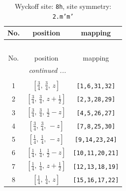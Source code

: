 \documentclass[fleqn,8pt]{jsarticle}
\begin{document}
\begin{longtable}{ccc}
\caption{Wyckoff site: {\tt 8h}, site symmetry: {\tt 2.m'm'}}
 \\
 \hline \hline
No. & position & mapping \\ \hline \endfirsthead

\multicolumn{2}{l}{\tablename\ \thetable{}} \\
 \hline \hline
No. & position & mapping \\ \hline \endhead

 \hline \hline
\multicolumn{2}{r}{\footnotesize\it continued ...} \\ \endfoot

 \hline \hline
\multicolumn{2}{r}{} \\ \endlastfoot

1 & $\left[ \frac{3}{4},\, \frac{3}{4},\, z \right]$ & {\tt [1,6,31,32]} \\ \hline
2 & $\left[ \frac{3}{4},\, \frac{3}{4},\, z + \frac{1}{2} \right]$ & {\tt [2,3,28,29]} \\ \hline
3 & $\left[ \frac{3}{4},\, \frac{3}{4},\, \frac{1}{2} - z \right]$ & {\tt [4,5,26,27]} \\ \hline
4 & $\left[ \frac{3}{4},\, \frac{3}{4},\, - z \right]$ & {\tt [7,8,25,30]} \\ \hline
5 & $\left[ \frac{1}{4},\, \frac{1}{4},\, - z \right]$ & {\tt [9,14,23,24]} \\ \hline
6 & $\left[ \frac{1}{4},\, \frac{1}{4},\, \frac{1}{2} - z \right]$ & {\tt [10,11,20,21]} \\ \hline
7 & $\left[ \frac{1}{4},\, \frac{1}{4},\, z + \frac{1}{2} \right]$ & {\tt [12,13,18,19]} \\ \hline
8 & $\left[ \frac{1}{4},\, \frac{1}{4},\, z \right]$ & {\tt [15,16,17,22]} \\
\end{longtable}
\renewcommand{\arraystretch}{1.2}
\end{document}
